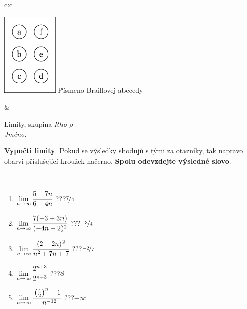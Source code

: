 \documentclass[10pt]{report}
\begin{document}
\begin{tabular}{c:c}
\begin{minipage}[c][104.5mm][t]{0.5\linewidth}
\begin{center}
\begin{minipage}{0.20\linewidth}
\begin{center}
\includegraphics[height=40mm]{../images/braille.png}
{\small Písmeno Braillovej abecedy}
\end{center}
\end{minipage}
\end{center}
\end{minipage}
&
\begin{minipage}[c][104.5mm][t]{0.5\linewidth}
\begin{center}
\vspace{7mm}
{\huge Limity, skupina \textit{Rho $\rho$} -}\\[5mm]
\textit{Jméno:}\phantom{xxxxxxxxxxxxxxxxxxxxxxxxxxxxxxxxxxxxxxxxxxxxxxxxxxxxxxxxxxxxxxxxx}\\[5mm]
\begin{minipage}{0.95\linewidth}
\begin{center}
\textbf{Vypočti limity}. Pokud se výsledky shodujú s tými za otazníky, tak napravo\\obarvi příslušející kroužek načerno. \textbf{Spolu odevzdejte výsledné slovo}.
\end{center}
\end{minipage}
\\[1mm]
\begin{minipage}{0.79\linewidth}
\begin{center}
\begin{varwidth}{\linewidth}
\begin{enumerate}
\normalsize
\item $\lim\limits_{n\to\infty}\cfrac{5-7n}{6-4n}$\quad \dotfill\; ???\;\dotfill \quad $\nicefrac{7}{4}$
\item $\lim\limits_{n\to\infty}\cfrac{7(-3+3n)}{(-4n-2)^2}$\quad \dotfill\; ???\;\dotfill \quad $\nicefrac{-3}{4}$
\item $\lim\limits_{n\to\infty}\cfrac{(2-2n)^2}{n^2+7n+7}$\quad \dotfill\; ???\;\dotfill \quad $\nicefrac{-2}{7}$
\item $\lim\limits_{n\to\infty}\cfrac{2^{n+3}}{2^{n+3}}$\quad \dotfill\; ???\;\dotfill \quad $8$
\item $\lim\limits_{n\to\infty}\cfrac{\left(\frac{4}{2}\right)^n -1}{-n^{-12}}$\quad \dotfill\; ???\;\dotfill \quad $-\infty$

\end{enumerate}
\end{varwidth}
\end{center}
\end{minipage}
\end{center}
\end{minipage}
\end{tabular}
\end{document}
